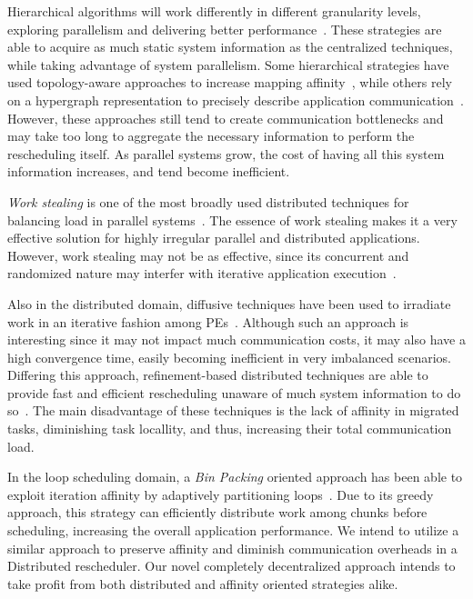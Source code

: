 Hierarchical algorithms will work differently in different granularity levels, exploring parallelism and delivering better performance~\cite{hybrid,nuco}.
These strategies are able to acquire as much static system information as the centralized techniques, while taking advantage of system parallelism.
Some hierarchical strategies have used topology-aware approaches to increase mapping affinity~\cite{nuco,hwtopo}, while others rely on a hypergraph representation to precisely describe application communication~\cite{ZoltanParHypRepart07}.
However, these approaches still tend to create communication bottlenecks and may take too long to aggregate the necessary information to perform the rescheduling itself.
As parallel systems grow, the cost of having all this system information increases, and tend become inefficient.

\textit{Work stealing} is one of the most broadly used distributed techniques for balancing load in parallel systems~\cite{DBLP:journals/ijpp/YangH18,Janjic2013}.
The essence of work stealing makes it a very effective solution for highly irregular parallel and distributed applications.
However, work stealing may not be as effective, since its concurrent and randomized nature may interfer with iterative application execution~\cite{lifflander2012work}.

Also in the distributed domain, diffusive techniques have been used to irradiate work in an iterative fashion among PEs~\cite{diffus}.
Although such an approach is interesting since it may not impact much communication costs, it may also have a high convergence time, easily becoming inefficient in very imbalanced scenarios.
Differing this approach, refinement-based distributed techniques are able to provide fast and efficient rescheduling unaware of much system information to do so~\cite{grapevine}.
The main disadvantage of these techniques is the lack of affinity in migrated tasks, diminishing task locallity, and thus, increasing their total communication load.

In the loop scheduling domain, a \textit{Bin Packing} oriented approach has been able to exploit iteration affinity by adaptively partitioning loops~\cite{Castro-Penna-WSCAD:2017}.
Due to its greedy approach, this strategy can efficiently distribute work among chunks before scheduling, increasing the overall application performance.
We intend to utilize a similar approach to preserve affinity and diminish communication overheads in a Distributed rescheduler.
Our novel completely decentralized approach intends to take profit from both distributed and affinity oriented strategies alike.

